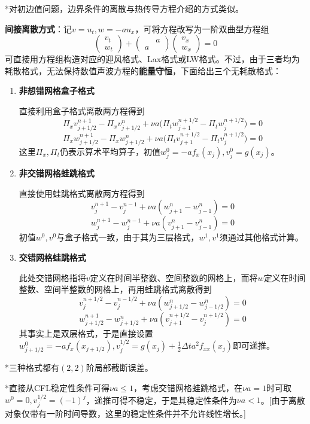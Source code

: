 \documentclass[a4paper,UTF8,fontset=windows]{ctexart}
\begin{document}
*对初边值问题，边界条件的离散与热传导方程介绍的方式类似。

\textbf{间接离散方式}：记$v=u_t,w=-au_x$，可将方程改写为一阶双曲型方程组
$$\begin{pmatrix}v_t\\w_t\end{pmatrix}+\begin{pmatrix}&a\\a&\end{pmatrix}\begin{pmatrix}v_x\\w_x\end{pmatrix}=0$$
可直接用方程组构造对应的迎风格式、Lax格式或LW格式。不过，由于三者均为耗散格式，无法保持数值声波方程的\textbf{能量守恒}，下面给出三个无耗散格式：
\begin{enumerate}
    \item \textbf{非想错网格盒子格式}
    
    直接利用盒子格式离散两方程得到
    $$\Pi_xv_{j+1/2}^{n+1}-\Pi_xv_{j+1/2}^n+\nu a\big(\Pi_tw_{j+1}^{n+1/2}-\Pi_tw_j^{n+1/2}\big)=0$$
    $$\Pi_xw_{j+1/2}^{n+1}-\Pi_xw_{j+1/2}^n+\nu a\big(\Pi_tv_{j+1}^{n+1/2}-\Pi_tv_j^{n+1/2}\big)=0$$
    这里$\Pi_x,\Pi_t$仍表示算术平均算子，初值$w_j^0=-af_x(x_j),v_j^0=g(x_j)$。

    \item \textbf{非交错网格蛙跳格式}
    
    直接使用蛙跳格式离散两方程得到
    $$v_j^{n+1}-v_j^{n-1}+\nu a(w_{j+1}^n-w_{j-1}^n)=0$$
    $$w_j^{n+1}-w_j^{n-1}+\nu a(v_{j+1}^n-v_{j-1}^n)=0$$
    初值$w^0,v^0$与盒子格式一致，由于其为三层格式，$w^1,v^1$须通过其他格式计算。

    \item \textbf{交错网格蛙跳格式}
    
    此处交错网格指将$v$定义在时间半整数、空间整数的网格上，而将$w$定义在时间整数、空间半整数的网格上，再用蛙跳格式离散得到
    $$v_j^{n+1/2}-v_j^{n-1/2}+\nu a(w_{j+1/2}^n-w_{j-1/2}^n)=0$$
    $$w_{j+1/2}^{n+1}-w_{j+1/2}^n+\nu a(v_{j+1}^{n+1/2}-v_j^{n+1/2})=0$$
    其事实上是双层格式，于是直接设置$w^0_{j+1/2}=-af_x(x_{j+1/2}),v^{1/2}_j=g(x_j)+\frac{1}{2}\Delta ta^2f_{xx}(x_j)$即可递推。
\end{enumerate}

*三种格式都有$(2,2)$阶局部截断误差。

*直接从CFL稳定性条件可得$\nu a\le1$，考虑交错网格蛙跳格式，在$\nu a=1$时可取$w^0=0,v_j^{1/2}=(-1)^j$，递推可得不稳定，于是其稳定性条件为$\nu a<1$。[由于离散对象仅带有一阶时间导数，这里的稳定性条件并不允许线性增长。]
\end{document}
